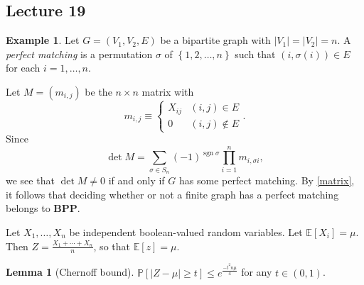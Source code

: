 \documentclass[10pt,letterpaper,cm]{nupset}
\theoremstyle{definition}
\newtheorem{exmp}[definition]{Example}
\theoremstyle{theorem}
\newtheorem{lemma}[definition]{Lemma}
\theoremstyle{remark}
\newcommand{\1}{\mathbf{1}}
\newcommand{\0}{\vec 0}
\DeclareMathOperator{\sgn}{sgn}
\begin{document}
\subsection{Lecture 19}

\begin{exmp}
Let $G=\left(V_1, V_2, E\right)$ be a bipartite graph with $\left\lvert{V_1}\right\rvert=\left\lvert{V_2}\right\rvert=n$. 
A \textit{perfect matching} is a permutation $\sigma$ of $\left\{1,2, \ldots, n\right\}$ such that $\left(i, \sigma(i)\right) \in E$ for each $i=1, \ldots, n$.

Let $M= \left(m_{i,j}\right)$ be the $n\times n$ matrix with $$m_{i,j} \equiv \begin{cases} X_{ij} & (i,j) \in E\\ 0 & (i,j) \notin E    \end{cases}.$$ Since $$\det{M} =  \sum_{\sigma \in S_n} ({-1})^{\sgn{\sigma}} \prod_{i=1}^n m_{i, \sigma{i}} ,$$ we see that $\det{M} \ne 0$ if and only if $G$ has some perfect matching. By \cref{matrix}, it follows that deciding whether or not a finite graph has a perfect matching belongs to $\mathbf{BPP}$.
\end{exmp}

\medskip

Let $X_1, \ldots, X_n$ be independent boolean-valued random variables. Let $\mathbb{E}[X_i]= \mu$. Then $Z= \frac{X_1 + \cdots + X_n}{n}$, so that $\mathbb{E}\left[z\right] = \mu$. 

\begin{lemma}[Chernoff bound]
$\mathbb{P}\left[\left\lvert{Z - \mu}\right\rvert \geq t\right] \leq e^{\frac{{-t^2n} \mu}{4}}$ for any $t\in (0,1)$.
\end{lemma}
\end{document}

